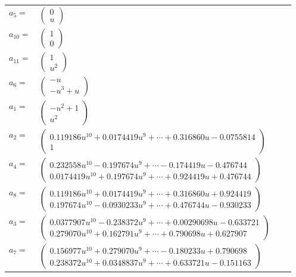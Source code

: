 \documentclass[1p]{elsarticle_modified}
\theoremstyle{definition}
\begin{document}
\begin{tabular}{m{7pt} m{180pt} m{7pt} m{180pt} }
\flushright $a_{5}=$&$\begin{pmatrix}0\\u\end{pmatrix}$ \\
\flushright $a_{10}=$&$\begin{pmatrix}1\\0\end{pmatrix}$ \\
\flushright $a_{11}=$&$\begin{pmatrix}1\\u^2\end{pmatrix}$ \\
\flushright $a_{6}=$&$\begin{pmatrix}- u\\- u^3+u\end{pmatrix}$ \\
\flushright $a_{1}=$&$\begin{pmatrix}- u^2+1\\u^2\end{pmatrix}$ \\
\flushright $a_{2}=$&$\begin{pmatrix}0.119186 u^{10}+0.0174419 u^{9}+\cdots+0.316860 u-0.0755814\\1\end{pmatrix}$ \\
\flushright $a_{4}=$&$\begin{pmatrix}0.232558 u^{10}-0.197674 u^{9}+\cdots-0.174419 u-0.476744\\0.0174419 u^{10}+0.197674 u^{9}+\cdots+0.924419 u+0.476744\end{pmatrix}$ \\
\flushright $a_{8}=$&$\begin{pmatrix}0.119186 u^{10}+0.0174419 u^{9}+\cdots+0.316860 u+0.924419\\0.197674 u^{10}-0.0930233 u^{9}+\cdots+0.476744 u-0.930233\end{pmatrix}$ \\
\flushright $a_{3}=$&$\begin{pmatrix}0.0377907 u^{10}-0.238372 u^{9}+\cdots+0.00290698 u-0.633721\\0.279070 u^{10}+0.162791 u^{9}+\cdots+0.790698 u+0.627907\end{pmatrix}$ \\
\flushright $a_{7}=$&$\begin{pmatrix}0.156977 u^{10}+0.279070 u^{9}+\cdots-0.180233 u+0.790698\\0.238372 u^{10}+0.0348837 u^{9}+\cdots+0.633721 u-0.151163\end{pmatrix}$ \\

\end{tabular}
\end{document}
